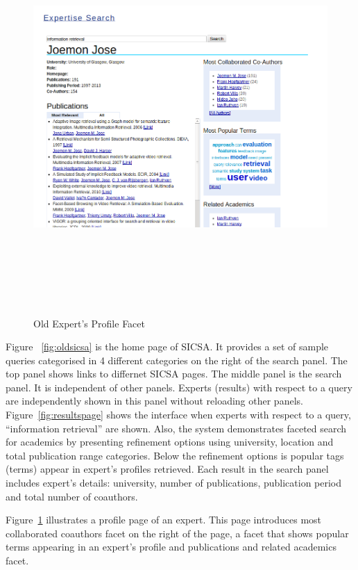  \begin{figure}
 \centering
 \includegraphics[width=13cm,height=15cm,keepaspectratio]{./figures/oldProfilePage.png}
 \caption{Old Expert's Profile Facet} \label{fig:profilepage} 
\end{figure}
Figure ~\ref{fig:oldsicsa} is the home page of SICSA. It provides a set of sample queries categorised in 4 different categories on the right of the 
search panel. The top panel shows links to differnet SICSA pages. The middle panel is the search panel. It is independent of other panels. 
Experts (results) with respect to a query are independently shown in this panel without reloading other panels. Figure~\ref{fig:resultspage} shows
the interface when experts with respect to a query, ``information retrieval'' are shown. Also, the system demonstrates 
faceted search for academics by presenting refinement options using university, location and total publication range categories.
Below the refinement options is popular tags (terms) appear in expert's profiles retrieved.
Each result in the search panel includes expert's details: university, number of publications, publication period and total number of coauthors.

Figure~\ref{fig:profilepage} illustrates a profile page of an expert. This page introduces most collaborated coauthors facet on the right of the page, a 
facet that shows popular terms appearing in an expert's profile and publications and related academics facet.

